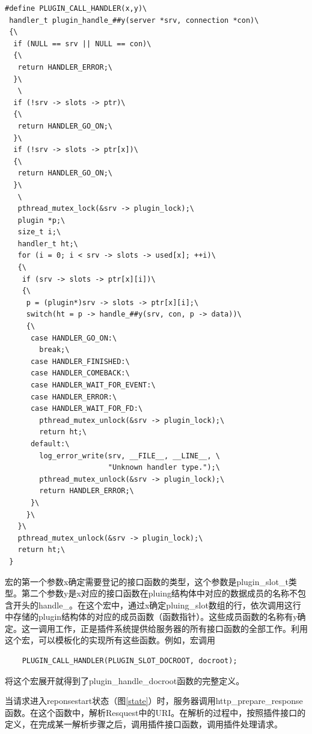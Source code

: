 \documentclass[12pt, twoside, a4paper, xetex]{report}
\begin{document}
\begin{verbatim}
#define PLUGIN_CALL_HANDLER(x,y)\
 handler_t plugin_handle_##y(server *srv, connection *con)\
 {\
  if (NULL == srv || NULL == con)\
  {\
   return HANDLER_ERROR;\
  }\
   \
  if (!srv -> slots -> ptr)\
  {\
   return HANDLER_GO_ON;\
  }\
  if (!srv -> slots -> ptr[x])\
  {\
   return HANDLER_GO_ON;\
  }\
   \
   pthread_mutex_lock(&srv -> plugin_lock);\
   plugin *p;\
   size_t i;\
   handler_t ht;\
   for (i = 0; i < srv -> slots -> used[x]; ++i)\
   {\
	if (srv -> slots -> ptr[x][i])\
	{\
	 p = (plugin*)srv -> slots -> ptr[x][i];\
	 switch(ht = p -> handle_##y(srv, con, p -> data))\
	 {\
	  case HANDLER_GO_ON:\
	    break;\
	  case HANDLER_FINISHED:\
	  case HANDLER_COMEBACK:\
	  case HANDLER_WAIT_FOR_EVENT:\
	  case HANDLER_ERROR:\
	  case HANDLER_WAIT_FOR_FD:\
		pthread_mutex_unlock(&srv -> plugin_lock);\
		return ht;\
	  default:\
		log_error_write(srv, __FILE__, __LINE__, \
						"Unknown handler type.");\
		pthread_mutex_unlock(&srv -> plugin_lock);\
		return HANDLER_ERROR;\
	  }\
     }\
   }\
   pthread_mutex_unlock(&srv -> plugin_lock);\
   return ht;\
 }
\end{verbatim}	
	
	宏的第一个参数x确定需要登记的接口函数的类型，这个参数是plugin\_slot\_t类型。第二个参数y是x对应的接口函数在pluing结构体中对应的数据成员的名称不包含开头的handle\_。在这个宏中，通过x确定pluing\_slot数组的行，依次调用这行中存储的plugin结构体的对应的成员函数（函数指针）。这些成员函数的名称有y确定。这一调用工作，正是插件系统提供给服务器的所有接口函数的全部工作。利用这个宏，可以模板化的实现所有这些函数。例如，宏调用
	
	\begin{verbatim}
	PLUGIN_CALL_HANDLER(PLUGIN_SLOT_DOCROOT, docroot);
	\end{verbatim}
	
	将这个宏展开就得到了plugin\_handle\_docroot函数的完整定义。
	
	当请求进入reponsestart状态（图\ref{state}）时，服务器调用http\_prepare\_response函数。在这个函数中，解析Resquest中的URI。在解析的过程中，按照插件接口的定义，在完成某一解析步骤之后，调用插件接口函数，调用插件处理请求。
	
\end{document}

